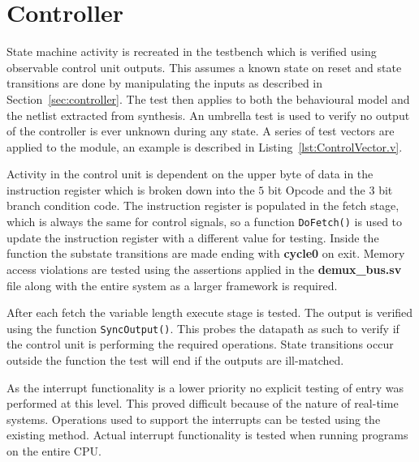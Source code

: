 
\section{Controller}

State machine activity is recreated in the testbench which is verified using observable control unit outputs.
This assumes a known state on reset and state transitions are done by manipulating the inputs as described in Section~\ref{sec:controller}.  
The test then applies to both the behavioural model and the netlist extracted from synthesis.
An umbrella test is used to verify no output of the controller is ever unknown during any state.
A series of test vectors are applied to the module, an example is described in Listing~\ref{lst:ControlVector.v}.

\begin{minipage}{\linewidth}

\end{minipage}

Activity in the control unit is dependent on the upper byte of data in the instruction register which is broken down into the $5$ bit Opcode and the $3$ bit branch condition code.  
The instruction register is populated in the fetch stage, which is always the same for control signals, so a function \texttt{DoFetch()} is used to update the instruction register with a different value for testing.
Inside the function the substate transitions are made ending with \textbf{cycle0} on exit.
Memory access violations are tested using the assertions applied in the \textbf{demux\_bus.sv} file along with the entire system as a larger framework is required.

After each fetch the variable length execute stage is tested.
The output is verified using the function \texttt{SyncOutput()}. 
This probes the datapath as such to verify if the control unit is performing the required operations.
State transitions occur outside the function the test will end if the outputs are ill-matched.

As the interrupt functionality is a lower priority no explicit testing of entry was performed at this level.
This proved difficult because of the nature of real-time systems.
Operations used to support the interrupts can be tested using the existing method.
Actual interrupt functionality is tested when running programs on the entire CPU.
